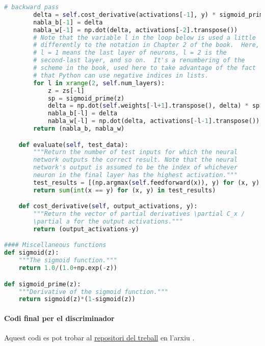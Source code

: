 \begin{lstlisting}[language=Python, caption=Codi original per la xarxa neuronal clàssica]
		# backward pass
		delta = self.cost_derivative(activations[-1], y) * sigmoid_prime(zs[-1])
		nabla_b[-1] = delta
		nabla_w[-1] = np.dot(delta, activations[-2].transpose())
		# Note that the variable l in the loop below is used a little
		# differently to the notation in Chapter 2 of the book.  Here,
		# l = 1 means the last layer of neurons, l = 2 is the
		# second-last layer, and so on.  It's a renumbering of the
		# scheme in the book, used here to take advantage of the fact
		# that Python can use negative indices in lists.
		for l in xrange(2, self.num_layers):
			z = zs[-l]
			sp = sigmoid_prime(z)
			delta = np.dot(self.weights[-l+1].transpose(), delta) * sp
			nabla_b[-l] = delta
			nabla_w[-l] = np.dot(delta, activations[-l-1].transpose())
		return (nabla_b, nabla_w)

	def evaluate(self, test_data):
		"""Return the number of test inputs for which the neural
		network outputs the correct result. Note that the neural
		network's output is assumed to be the index of whichever
		neuron in the final layer has the highest activation."""
		test_results = [(np.argmax(self.feedforward(x)), y) for (x, y) in test_data]
		return sum(int(x == y) for (x, y) in test_results)

	def cost_derivative(self, output_activations, y):
		"""Return the vector of partial derivatives \partial C_x /
		\partial a for the output activations."""
		return (output_activations-y)

#### Miscellaneous functions
def sigmoid(z):
	"""The sigmoid function."""
	return 1.0/(1.0+np.exp(-z))

def sigmoid_prime(z):
	"""Derivative of the sigmoid function."""
	return sigmoid(z)*(1-sigmoid(z))
\end{lstlisting}

\paragraph{Codi final per el discriminador}
\label{lst:disc_final}
Aquest codi es pot trobar al \href{https://github.com/tomiock/qGAN}{repositori del treball} en l'arxiu . 

